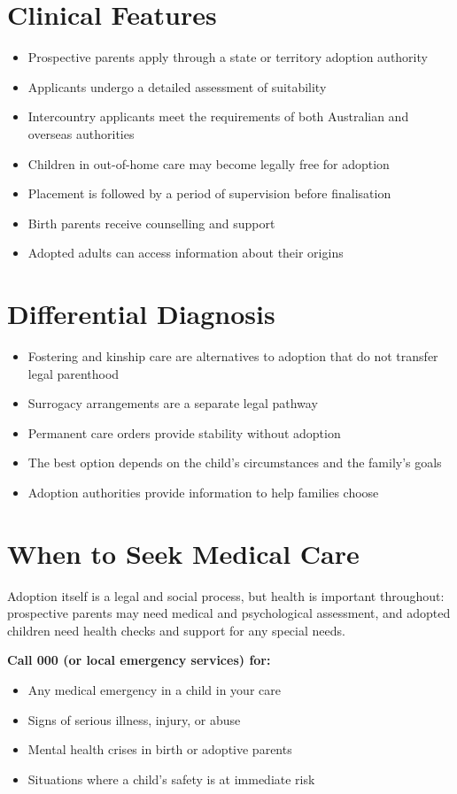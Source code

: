 \section*{Clinical Features}
\begin{itemize}
    \item Prospective parents apply through a state or territory adoption authority
    \item Applicants undergo a detailed assessment of suitability
    \item Intercountry applicants meet the requirements of both Australian and overseas authorities
    \item Children in out-of-home care may become legally free for adoption
    \item Placement is followed by a period of supervision before finalisation
    \item Birth parents receive counselling and support
    \item Adopted adults can access information about their origins
\end{itemize}

\section*{Differential Diagnosis}
\begin{itemize}
    \item Fostering and kinship care are alternatives to adoption that do not transfer legal parenthood
    \item Surrogacy arrangements are a separate legal pathway
    \item Permanent care orders provide stability without adoption
    \item The best option depends on the child's circumstances and the family's goals
    \item Adoption authorities provide information to help families choose
\end{itemize}

\section*{When to Seek Medical Care}
Adoption itself is a legal and social process, but health is important throughout: prospective parents may need medical and psychological assessment, and adopted children need health checks and support for any special needs.

\textbf{Call 000 (or local emergency services) for:}
\begin{itemize}
    \item Any medical emergency in a child in your care
    \item Signs of serious illness, injury, or abuse
    \item Mental health crises in birth or adoptive parents
    \item Situations where a child's safety is at immediate risk
\end{itemize}

